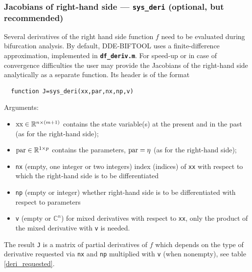 \documentclass[10pt]{scrartcl}
\newcommand{\DDEBIFCODE}{\textsc{DDE-BIFTOOL}}
\newcommand{\file}[1]{\textbf{\texttt{#1}}}
\newcommand{\parm}[1]{\mathsf{#1}}
\newcommand{\RR}{\mathbb{R}}
\newcommand{\CC}{\mathbb{C}}
\newcommand{\blist}[1]{\mbox{\lstinline!#1!}}
\begin{document}
\subsubsection{Jacobians of right-hand side --- \blist{sys_deri} (optional, but recommended)}\label{sec:constjac}
Several derivatives of the right hand side function $f$ need to be
evaluated during bifurcation analysis. By default, \DDEBIFCODE{} uses
a finite-difference approximation, implemented in
\file{df\_deriv.m}. For speed-up or in case of convergence
difficulties the user may provide the Jacobians of the right-hand side
analytically as a separate function. Its header is of the format
\begin{lstlisting}
  function J=sys_deri(xx,par,nx,np,v)
\end{lstlisting}
Arguments:
\begin{itemize}
\item $\blist{xx}\in\RR^{n\times (m+1)}$ contains the state
variable(s) at the present and in the past (as for the right-hand side);
\item $\blist{par}\in\RR^{1\times
  p}$ contains the parameters, $\blist{par}=\eta$  (as for the right-hand side);
\item \blist{nx} (empty, one integer or two integers) index (indices) of
  \blist{xx} with respect to which the right-hand side is to be
  differentiated
\item \blist{np} (empty or integer) whether right-hand side is to be
  differentiated with respect to parameters
\item \blist{v} (empty or $\CC^n$) for mixed derivatives with respect
  to \blist{xx}, only the product of the mixed derivative with
  \blist{v} is needed.
\end{itemize}
The result \blist{J} is a matrix of
partial derivatives of $f$ which depends on the type of derivative
requested via \blist{nx} and \blist{np} multiplied with \blist{v} (when
nonempty), see table \ref{deri_requested}.
\end{document}
